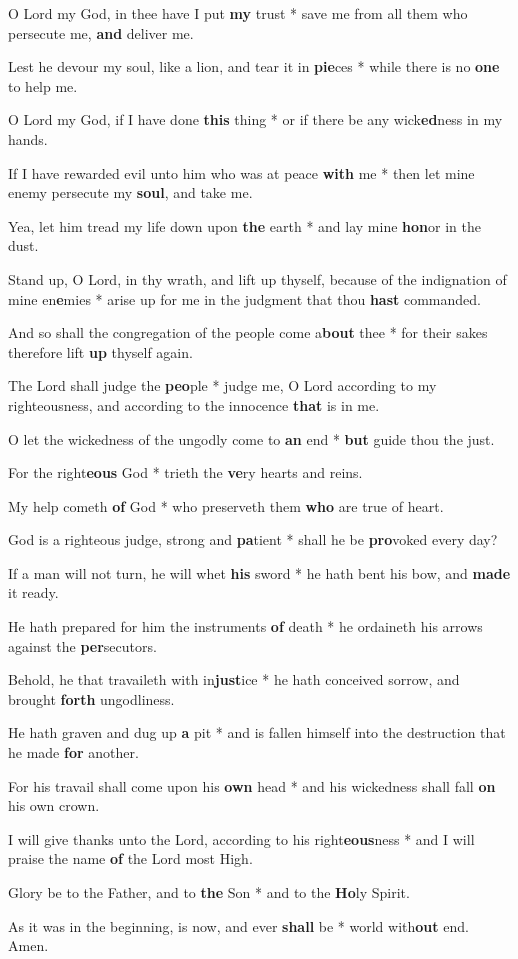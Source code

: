 \begin{multicols}{2}
	O Lord my God, in thee have I put \textbf{my} trust * save me from all them who persecute me, \textbf{and} deliver me.
	
	Lest he devour my soul, like a lion, and tear it in \textbf{pie}ces * while there is no \textbf{one} to help me.
	
	O Lord my God, if I have done \textbf{this} thing * or if there be any wick\textbf{ed}ness in my hands.
	
	If I have rewarded evil unto him who was at peace \textbf{with} me * then let mine enemy persecute my \textbf{soul}, and take me.
	
	Yea, let him tread my life down upon \textbf{the} earth * and lay mine \textbf{hon}or in the dust.
	
	Stand up, O Lord, in thy wrath, and lift up thyself, because of the indignation of mine en\textbf{e}mies * arise up for me in the judgment that thou \textbf{hast} commanded.
	
	And so shall the congregation of the people come a\textbf{bout} thee * for their sakes therefore lift \textbf{up} thyself again.
	
	The Lord shall judge the \textbf{peo}ple * judge me, O Lord according to my righteousness, and according to the innocence \textbf{that} is in me.
	
	O let the wickedness of the ungodly come to \textbf{an} end * \textbf{but} guide thou the just.
	
	For the right\textbf{eous} God * trieth the \textbf{ve}ry hearts and reins.
	
	My help cometh \textbf{of} God * who preserveth them \textbf{who} are true of heart.
	
	God is a righteous judge, strong and \textbf{pa}tient * shall he be \textbf{pro}voked every day?
	
	If a man will not turn, he will whet \textbf{his} sword * he hath bent his bow, and \textbf{made} it ready.
	
	He hath prepared for him the instruments \textbf{of} death * he ordaineth his arrows against the \textbf{per}secutors.
	
	Behold, he that travaileth with in\textbf{just}ice * he hath conceived sorrow, and brought \textbf{forth} ungodliness.
	
	He hath graven and dug up \textbf{a} pit * and is fallen himself into the destruction that he made \textbf{for} another.
	
	For his travail shall come upon his \textbf{own} head * and his wickedness shall fall \textbf{on} his own crown.
	
	I will give thanks unto the Lord, according to his right\textbf{eous}ness * and I will praise the name \textbf{of} the Lord most High.
	
	Glory be to the Father, and to \textbf{the} Son * and to the \textbf{Ho}ly Spirit.
	
	As it was in the beginning, is now, and ever \textbf{shall} be * world with\textbf{out} end. Amen.
\end{multicols}